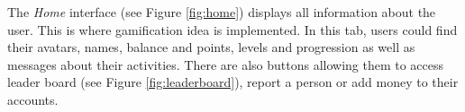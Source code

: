 The \emph{Home} interface (see Figure \ref {fig:home}) displays all information about the user. This is where gamification idea is implemented. In this tab, users could find their avatars, names,  balance and points, levels and progression as well as messages about their activities. There are also buttons allowing them to access leader board (see Figure \ref{fig:leaderboard}), report a person or add money to their accounts. 